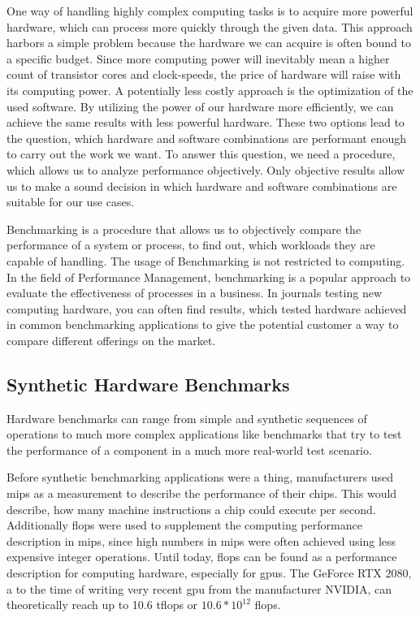One way of handling highly complex computing tasks is to acquire more powerful
hardware, which can process more quickly through the given data. This approach
harbors a simple problem because the hardware we can acquire is often
bound to a specific budget. Since more computing power will inevitably mean a
higher count of transistor cores and clock-speeds, the price of hardware will
raise with its computing power. A potentially less costly approach is the
optimization of the used software. By utilizing the power of our hardware more
efficiently, we can achieve the same results with less powerful hardware. These
two options lead to the question, which hardware and software combinations are
performant enough to carry out the work we want. To answer this question, we
need a procedure, which allows us to analyze performance objectively. Only
objective results allow us to make a sound decision in which hardware and
software combinations are suitable for our use cases.
\cite{mooresLaw}

Benchmarking is a procedure that allows us to objectively compare the
performance of a system or process, to find out, which workloads they are
capable of handling. The usage of Benchmarking is not restricted to computing.
In the field of Performance Management, benchmarking is a popular approach to
evaluate the effectiveness of processes in a business. In journals testing new
computing hardware, you can often find results, which tested hardware achieved
in common benchmarking applications to give the potential customer a way to
compare different offerings on the market.
\cite{BenchmPerfManagement}



\subsection{Synthetic Hardware Benchmarks}

Hardware benchmarks can range from simple and synthetic sequences of operations
to much more complex applications like benchmarks that try to test the
performance of a component in a much more real-world test scenario.

Before synthetic benchmarking applications were a thing, manufacturers used
\gls{mips} as a measurement to describe the performance of their chips. This would
describe, how many machine instructions a chip could execute per second.
Additionally \gls{flops} were used to supplement the computing performance
description in \gls{mips}, since high numbers in \gls{mips} were often achieved
using less expensive integer operations. Until today, \gls{flops} can be found
as a performance description for computing hardware, especially for \glspl{gpu}.
The GeForce RTX 2080, a to the time of writing very recent \gls{gpu} from the
manufacturer NVIDIA, can theoretically reach up to 10.6 \gls{tflops} or $10.6 *
10^{12}$ \gls{flops}.
\cite{heiseGtx2080}


